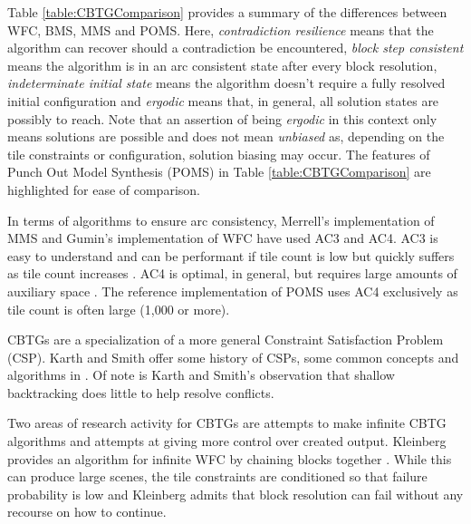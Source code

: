 Table \ref{table:CBTGComparison} provides a summary of the differences between WFC, BMS, MMS and POMS.
Here, \textit{contradiction resilience} means that the algorithm can recover should a contradiction be encountered,
\textit{block step consistent} means the algorithm is in an arc consistent state after every block resolution,
\textit{indeterminate initial state} means the algorithm doesn't require a fully resolved initial configuration and
\textit{ergodic} means that, in general, all solution states are possibly to reach.
Note that an assertion of being \textit{ergodic} in this context only means solutions
are possible and does not mean \textit{unbiased} as, depending on the tile constraints or configuration,
solution biasing may occur.
The features of Punch Out Model Synthesis (POMS) in Table \ref{table:CBTGComparison} are highlighted for ease of comparison.

In terms of algorithms to ensure arc consistency, Merrell's implementation of MMS \cite{Merrell_mms_2021} and Gumin's implementation of WFC \cite{Gumin_2016} have used AC3 and AC4.
AC3 is easy to understand and can be performant if tile count is low but quickly suffers as tile count increases \cite{Wallace1993WhyAI}.
AC4 is optimal, in general, but requires large amounts of auxiliary space \cite{Mohr_Henderson_1986}.
The reference implementation of POMS uses AC4 exclusively as tile count is often large (1,000 or more).


CBTGs are a specialization of a more general Constraint Satisfaction Problem (CSP).
Karth and Smith offer some history of CSPs, some common concepts and algorithms in \cite{Karth_Smith_2017, Karth_Smith_2022}.
Of note is Karth and Smith's observation that shallow backtracking does little to help resolve conflicts.


Two areas of research activity for CBTGs are attempts to make infinite CBTG algorithms
and attempts at giving more control over created output.
Kleinberg provides an algorithm for infinite WFC by chaining blocks together \cite{Kleinberg_2019}.
While this can produce large scenes, the tile constraints are conditioned so that failure probability is low and Kleinberg admits
that block resolution can fail without any recourse on how to continue.

